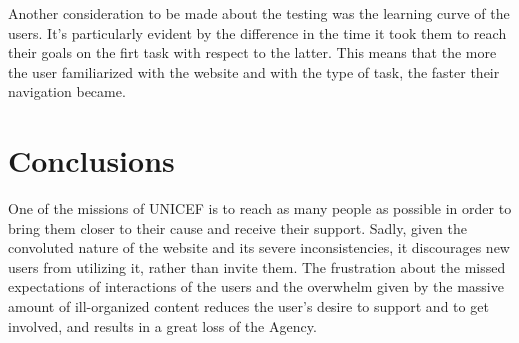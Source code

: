 Another consideration to be made about the testing was the learning curve of the users. It's particularly evident by the difference in the time it took them to reach their goals on the firt task with respect to the latter.
This means that the more the user familiarized with the website and with the type of task, the faster their navigation became.

\section{Conclusions}
One of the missions of UNICEF is to reach as many people as possible in order to bring them closer to their cause and receive their support. Sadly, given the convoluted nature of the website and its severe inconsistencies, it discourages new users from utilizing it, rather than invite them.
The frustration about the missed expectations of interactions of the users and the overwhelm given by the massive amount of ill-organized content reduces the user's desire to support and to get involved, and results in a great loss of the Agency.